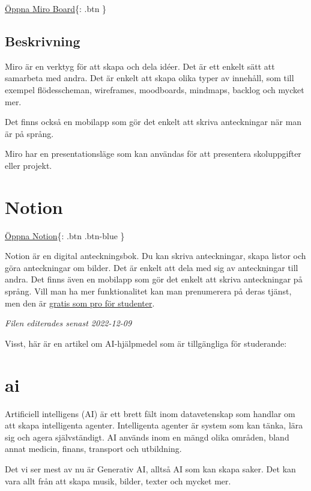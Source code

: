 \href{https://miro.com/}{Öppna Miro Board}\{: .btn \}

\hypertarget{beskrivning}{%
\subsection{Beskrivning}\label{beskrivning}}

Miro är en verktyg för att skapa och dela idéer. Det är ett enkelt sätt
att samarbeta med andra. Det är enkelt att skapa olika typer av
innehåll, som till exempel flödesscheman, wireframes, moodboards,
mindmaps, backlog och mycket mer.

Det finns också en mobilapp som gör det enkelt att skriva anteckningar
när man är på språng.

Miro har en presentationsläge som kan användas för att presentera
skoluppgifter eller projekt.

\hypertarget{notion}{%
\section{Notion}\label{notion}}

\href{https://www.notion.so/}{Öppna Notion}\{: .btn .btn-blue \}

Notion är en digital anteckningsbok. Du kan skriva anteckningar, skapa
listor och göra anteckningar om bilder. Det är enkelt att dela med sig
av anteckningar till andra. Det finns även en mobilapp som gör det
enkelt att skriva anteckningar på språng. Vill man ha mer funktionalitet
kan man prenumerera på deras tjänst, men den är
\href{https://www.notion.so/product/notion-for-education}{gratis som pro
för studenter}.

\emph{Filen editerades senast 2022-12-09}

Visst, här är en artikel om AI-hjälpmedel som är tillgängliga för
studerande:

\hypertarget{ai}{%
\section{ai}\label{ai}}

Artificiell intelligens (AI) är ett brett fält inom datavetenskap som
handlar om att skapa intelligenta agenter. Intelligenta agenter är
system som kan tänka, lära sig och agera självständigt. AI används inom
en mängd olika områden, bland annat medicin, finans, transport och
utbildning.

Det vi ser mest av nu är Generativ AI, alltså AI som kan skapa saker.
Det kan vara allt från att skapa musik, bilder, texter och mycket mer.

